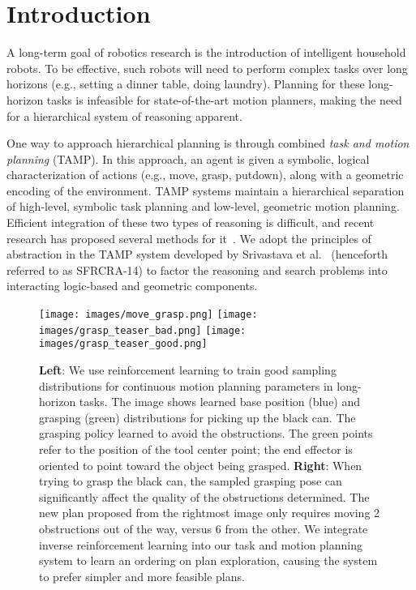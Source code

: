 \section{Introduction}
A long-term goal of robotics research is the introduction of
intelligent household robots.  To be effective, such robots will need
to perform complex tasks over long horizons (e.g., setting a dinner
table, doing laundry). Planning for these long-horizon tasks is
infeasible for state-of-the-art motion planners, making the need for a
hierarchical system of reasoning apparent.

One way to approach hierarchical planning is through combined
\emph{task and motion planning} (TAMP). In this approach, an agent is
given a symbolic, logical characterization of actions (e.g., move,
grasp, putdown), along with a geometric encoding of the
environment. TAMP systems maintain a hierarchical separation of
high-level, symbolic task planning and low-level, geometric motion
planning.  Efficient integration of these two types of reasoning is
difficult, and recent research has proposed several methods for
it~\cite{srivastava2014combined, kaelbling2011hierarchical,
  lagriffoul2014orientation, GarrettWAFR14, dornhege2012semantic}.
We adopt the principles of abstraction in the TAMP system developed by
Srivastava et al.~\cite{srivastava2014combined} (henceforth referred
to as SFRCRA-14) to factor the reasoning and search problems into
interacting logic-based and geometric components.

\begin{figure}[t]
  \centering
    \noindent
    \texttt{[image: images/move\_grasp.png]}\hspace{6 mm}
    \texttt{[image: images/grasp\_teaser\_bad.png]}
    \texttt{[image: images/grasp\_teaser\_good.png]}
  \caption{\small{\textbf{Left}: We use reinforcement learning to train good sampling distributions for
      continuous motion planning parameters in long-horizon tasks.
      The image shows learned base position (blue) and
      grasping (green) distributions for picking up the black can. The grasping
      policy learned to avoid the obstructions. The green points refer
      to the position of the tool center point; the end effector is oriented
      to point toward the object being grasped. \textbf{Right}: When trying to grasp the black can, the sampled grasping pose can
      significantly affect the quality of the obstructions determined. The new plan proposed from the rightmost image only
      requires moving 2 obstructions out of the way, versus 6 from the other. We integrate inverse reinforcement learning into our task and
      motion planning system to learn an ordering on plan exploration, causing the system to prefer simpler and more feasible plans.}}
  \label{fig:cover}
\end{figure}

